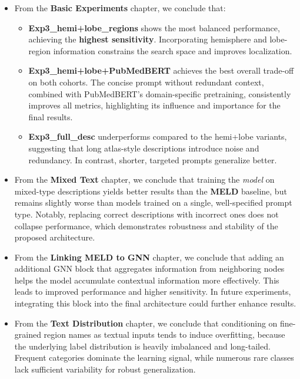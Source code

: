 \documentclass[a4paper,12pt]{article}
\begin{document}
\begin{itemize}
    \item From the \textbf{Basic Experiments} chapter, we conclude that:
    \begin{itemize}
        \item \textbf{Exp3\_hemi+lobe\_regions} shows the most balanced performance, achieving the \textbf{highest sensitivity}. Incorporating hemisphere and lobe-region information constrains the search space and improves localization.

        \item \textbf{Exp3\_hemi+lobe+PubMedBERT} achieves the best overall trade-off on both cohorts. 
        The concise prompt without redundant context, combined with PubMedBERT’s domain-specific pretraining, consistently improves all metrics, highlighting its influence and importance for the final results.
    
        \item \textbf{Exp3\_full\_desc} underperforms compared to the hemi+lobe variants, suggesting that long atlas-style descriptions introduce noise and redundancy. In contrast, shorter, targeted prompts generalize better.
    \end{itemize}

    \item From the \textbf{Mixed Text} chapter, we conclude that training the \emph{model} on mixed-type descriptions yields better results than the \textbf{MELD} baseline, but remains slightly worse than models trained on a single, well-specified prompt type. Notably, replacing correct descriptions with incorrect ones does not collapse performance, which demonstrates robustness and stability of the proposed architecture.

    \item From the \textbf{Linking MELD to GNN} chapter, we conclude that adding an additional GNN block that aggregates information from neighboring nodes helps the model accumulate contextual information more effectively. This leads to improved performance and higher sensitivity. In future experiments, integrating this block into the final architecture could further enhance results.
   
    \item From the \textbf{Text Distribution} chapter, we conclude that conditioning on fine-grained region names as textual inputs tends to induce overfitting, because the underlying label distribution is heavily imbalanced and long-tailed. Frequent categories dominate the learning signal, while numerous rare classes lack sufficient variability for robust generalization.


\end{itemize}
\end{document}
